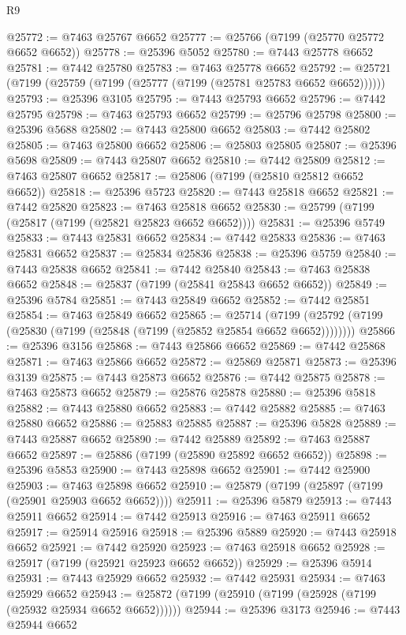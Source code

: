 \begin{lexlean}{R9}
\begin{coremodule}
{{{{{{{{{{{{{{{{{{{{{{{{{{{{{{{{{{{{{{{{{{{{{{{{{{{{{{{{{{{{{{{{{{{{{{{{{{{{{{{{{{{{@25772 := @7463 @25767 @6652
@25777 := @25766 (@7199 (@25770 @25772 @6652 @6652))
@25778 := @25396 @5052
@25780 := @7443 @25778 @6652
@25781 := @7442 @25780
@25783 := @7463 @25778 @6652
@25792 := @25721 (@7199 (@25759 (@7199 (@25777 (@7199 (@25781 @25783 @6652 @6652))))))
@25793 := @25396 @3105
@25795 := @7443 @25793 @6652
@25796 := @7442 @25795
@25798 := @7463 @25793 @6652
@25799 := @25796 @25798
@25800 := @25396 @5688
@25802 := @7443 @25800 @6652
@25803 := @7442 @25802
@25805 := @7463 @25800 @6652
@25806 := @25803 @25805
@25807 := @25396 @5698
@25809 := @7443 @25807 @6652
@25810 := @7442 @25809
@25812 := @7463 @25807 @6652
@25817 := @25806 (@7199 (@25810 @25812 @6652 @6652))
@25818 := @25396 @5723
@25820 := @7443 @25818 @6652
@25821 := @7442 @25820
@25823 := @7463 @25818 @6652
@25830 := @25799 (@7199 (@25817 (@7199 (@25821 @25823 @6652 @6652))))
@25831 := @25396 @5749
@25833 := @7443 @25831 @6652
@25834 := @7442 @25833
@25836 := @7463 @25831 @6652
@25837 := @25834 @25836
@25838 := @25396 @5759
@25840 := @7443 @25838 @6652
@25841 := @7442 @25840
@25843 := @7463 @25838 @6652
@25848 := @25837 (@7199 (@25841 @25843 @6652 @6652))
@25849 := @25396 @5784
@25851 := @7443 @25849 @6652
@25852 := @7442 @25851
@25854 := @7463 @25849 @6652
@25865 := @25714
    (@7199 (@25792 (@7199 (@25830 (@7199 (@25848 (@7199 (@25852 @25854 @6652 @6652))))))))
@25866 := @25396 @3156
@25868 := @7443 @25866 @6652
@25869 := @7442 @25868
@25871 := @7463 @25866 @6652
@25872 := @25869 @25871
@25873 := @25396 @3139
@25875 := @7443 @25873 @6652
@25876 := @7442 @25875
@25878 := @7463 @25873 @6652
@25879 := @25876 @25878
@25880 := @25396 @5818
@25882 := @7443 @25880 @6652
@25883 := @7442 @25882
@25885 := @7463 @25880 @6652
@25886 := @25883 @25885
@25887 := @25396 @5828
@25889 := @7443 @25887 @6652
@25890 := @7442 @25889
@25892 := @7463 @25887 @6652
@25897 := @25886 (@7199 (@25890 @25892 @6652 @6652))
@25898 := @25396 @5853
@25900 := @7443 @25898 @6652
@25901 := @7442 @25900
@25903 := @7463 @25898 @6652
@25910 := @25879 (@7199 (@25897 (@7199 (@25901 @25903 @6652 @6652))))
@25911 := @25396 @5879
@25913 := @7443 @25911 @6652
@25914 := @7442 @25913
@25916 := @7463 @25911 @6652
@25917 := @25914 @25916
@25918 := @25396 @5889
@25920 := @7443 @25918 @6652
@25921 := @7442 @25920
@25923 := @7463 @25918 @6652
@25928 := @25917 (@7199 (@25921 @25923 @6652 @6652))
@25929 := @25396 @5914
@25931 := @7443 @25929 @6652
@25932 := @7442 @25931
@25934 := @7463 @25929 @6652
@25943 := @25872 (@7199 (@25910 (@7199 (@25928 (@7199 (@25932 @25934 @6652 @6652))))))
@25944 := @25396 @3173
@25946 := @7443 @25944 @6652
}}}}}}}}}}}}}}}}}}}}}}}}}}}}}}}}}}}}}}}}}}}}}}}}}}}}}}}}}}}}}}}}}}}}}}}}}}}}}}}}}}}}
\end{coremodule}
\end{lexlean}
